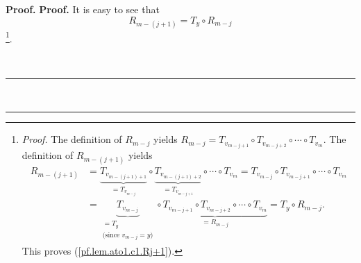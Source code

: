 \documentclass[numbers=enddot,12pt,final,onecolumn,notitlepage]{scrartcl}%
\theoremstyle{definition}
\newenvironment{verlong}{}{}
\newenvironment{proof}[1][Proof]{\noindent\textbf{#1.} }{\ \rule{0.5em}{0.5em}}
\begin{document}
\begin{verlong}
\begin{proof}
\begin{proof}
It is easy to see that%
\begin{equation}
R_{m-\left(  j+1\right)  }=T_{y}\circ R_{m-j} \label{pf.lem.ato1.c1.Rj+1}%
\end{equation}
\footnote{\textit{Proof.} The definition of $R_{m-j}$ yields $R_{m-j}%
=T_{v_{m-j+1}}\circ T_{v_{m-j+2}}\circ\cdots\circ T_{v_{m}}$. The definition
of $R_{m-\left(  j+1\right)  }$ yields%
\begin{align*}
R_{m-\left(  j+1\right)  }  &  =\underbrace{T_{v_{m-\left(  j+1\right)  +1}}%
}_{=T_{v_{m-j}}}\circ\underbrace{T_{v_{m-\left(  j+1\right)  +2}}%
}_{=T_{v_{m-j+1}}}\circ\cdots\circ T_{v_{m}}=T_{v_{m-j}}\circ T_{v_{m-j+1}%
}\circ\cdots\circ T_{v_{m}}\\
&  =\underbrace{T_{v_{m-j}}}_{\substack{=T_{y}\\\text{(since }v_{m-j}%
=y\text{)}}}\circ\underbrace{T_{v_{m-j+1}}\circ T_{v_{m-j+2}}\circ\cdots\circ
T_{v_{m}}}_{=R_{m-j}}=T_{y}\circ R_{m-j}.
\end{align*}
This proves (\ref{pf.lem.ato1.c1.Rj+1}).}.


\end{proof}
\end{proof}
\end{verlong}
\end{document}
